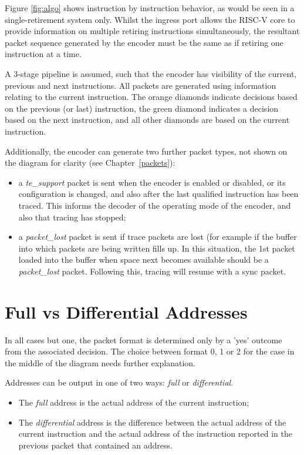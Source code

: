 Figure \ref{fig:algo} shows instruction by instruction behavior, as would be
seen in a single-retirement system only.  Whilst the ingress port allows the RISC-V core to
provide information on multiple retiring instructions simultaneously, the resultant packet
sequence generated by the encoder must be the same as if retiring one instruction at a time.

A 3-stage pipeline is assumed, such that the encoder has 
visibility of the current, previous and next instructions.  All packets are generated using 
information relating to the current instruction.  The orange diamonds indicate decisions 
based on the previous (or last) instruction, the green diamond indicates a decision based on the
next instruction, and all other diamonds are based on the current instruction.

Additionally, the encoder can generate two further packet types, not shown on the diagram for 
clarity (see Chapter~\ref{packets}):

\begin{itemize}
  \item a \textit{te\_support} packet is sent when the encoder is enabled or disabled, or its
    configuration is changed, and also after the last qualified instruction has been traced.
    This informs the decoder of the operating mode of the encoder, and also that tracing has
    stopped;
  \item a \textit{packet\_lost} packet is sent if trace packets are lost (for example if the 
    buffer into which packets are being written fills up.  In this situation, the 1st packet 
    loaded into the buffer when space next becomes available should be a \textit{packet\_lost} 
    packet.  Following this, tracing will resume with a sync packet.
\end{itemize}

\section{Full vs Differential Addresses} \label{addresses}
In all cases but one, the packet format is determined only by a 'yes' outcome from the 
associated decision.  The choice between format 0, 1 or 2 for the case in the middle of the 
diagram needs further explanation.  

Addresses can be output in one of two ways: \textit{full} or \textit{differential}.

\begin{itemize}
  \item The \textit{full} address is the actual address of the current instruction;
  \item The \textit{differential} address is the difference between the actual address of 
    the current instruction and the actual address of the instruction reported in the 
    previous packet that contained an address.
\end{itemize}

